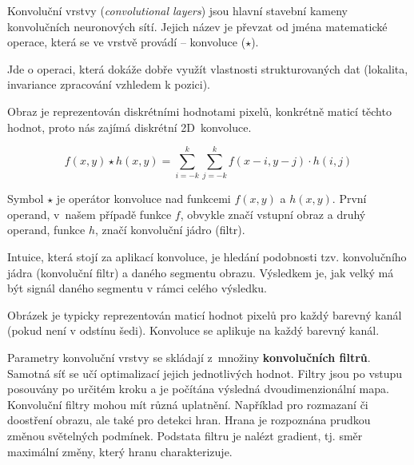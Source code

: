 \begin{compactitem}
    \item Konvoluční vrstvy (\textit{convolutional layers}) jsou hlavní stavební kameny konvolučních neuronových sítí. Jejich název je převzat od jména matematické operace, která se ve vrstvě provádí -- konvoluce ($\star$). \begin{compactitem}
        \item Jde o operaci, která dokáže dobře využít vlastnosti strukturovaných dat (lokalita, invariance zpracování vzhledem k pozici).

        \item Obraz je reprezentován diskrétními hodnotami pixelů, konkrétně maticí těchto hodnot, proto nás zajímá diskrétní 2D~konvoluce.

        \begin{equation}
            f(x,y) \star h(x,y)=\sum_{i=-k}^{k}\sum_{j=-k}^{k}f(x-i,y-j)\cdot h(i,j)
        \end{equation}

        \item Symbol $\star$ je operátor konvoluce nad funkcemi $f(x,y)$ a $h(x,y)$. První operand, v~našem případě funkce $f$, obvykle značí vstupní obraz a druhý operand, funkce $h$, značí konvoluční jádro (filtr).
    \end{compactitem}

    \item Intuice, která stojí za aplikací konvoluce, je hledání podobnosti tzv. konvolučního jádra (konvoluční filtr) a daného segmentu obrazu. Výsledkem je, jak velký má být signál daného segmentu v rámci celého výsledku.


    \item Obrázek je typicky reprezentován maticí hodnot pixelů pro každý barevný kanál (pokud není v odstínu šedi). Konvoluce se aplikuje na každý barevný kanál.

    \item Parametry konvoluční vrstvy se skládají z~množiny \textbf{konvolučních filtrů}. Samotná síť se učí optimalizací jejich jednotlivých hodnot. Filtry jsou po vstupu posouvány po určitém kroku a je počítána výsledná dvoudimenzionální mapa. Konvoluční filtry mohou mít různá uplatnění. Například pro rozmazaní či doostření obrazu, ale také pro  detekci hran. Hrana je rozpoznána prudkou změnou světelných podmínek. Podstata filtru je nalézt gradient, tj. směr maximální změny, který hranu charakterizuje.


\end{compactitem}

